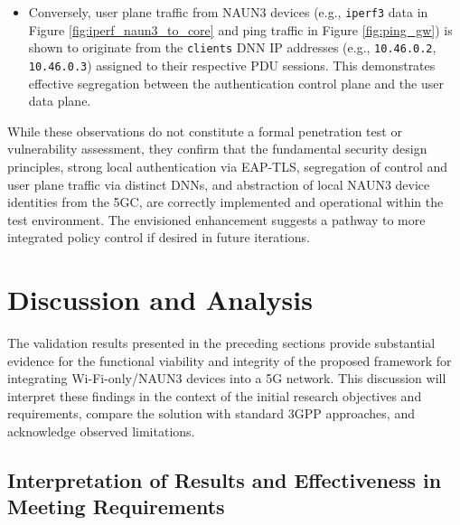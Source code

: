 \begin{itemize}
{\begin{itemize}
\begin{lstlisting}[caption=\texttt{hostapd} failing due to wrong local address,label={lst:hostapd_fail}]
(...)
25 | 1748702388.755637: RADIUS local address: 10.0.2.15:42579
(...)
216| 1748702566.372520: RADIUS local address: 10.45.0.2:50371
(...)
\end{lstlisting}

            \item Conversely, user plane traffic from \ac{NAUN3} devices (e.g., \texttt{iperf3} data in Figure \ref{fig:iperf_naun3_to_core} and ping traffic in Figure \ref{fig:ping_gw}) is shown to originate from the \texttt{clients} \ac{DNN} \ac{IP} addresses (e.g., \texttt{10.46.0.2}, \texttt{10.46.0.3}) assigned to their respective \ac{PDU} sessions. This demonstrates effective segregation between the authentication control plane and the user data plane.
        \end{itemize}
    }
\end{itemize}

While these observations do not constitute a formal penetration test or vulnerability assessment, they confirm that the fundamental security design principles, strong local authentication via \ac{EAP-TLS}, segregation of control and user plane traffic via distinct \acp{DNN}, and abstraction of local \ac{NAUN3} device identities from the \ac{5GC}, are correctly implemented and operational within the test environment. The envisioned enhancement suggests a pathway to more integrated policy control if desired in future iterations.

\section{Discussion and Analysis}

The validation results presented in the preceding sections provide substantial evidence for the functional viability and integrity of the proposed framework for integrating Wi-Fi-only/\ac{NAUN3} devices into a \ac{5G} network. This discussion will interpret these findings in the context of the initial research objectives and requirements, compare the solution with standard \ac{3GPP} approaches, and acknowledge observed limitations.

\subsection{Interpretation of Results and Effectiveness in Meeting Requirements}


